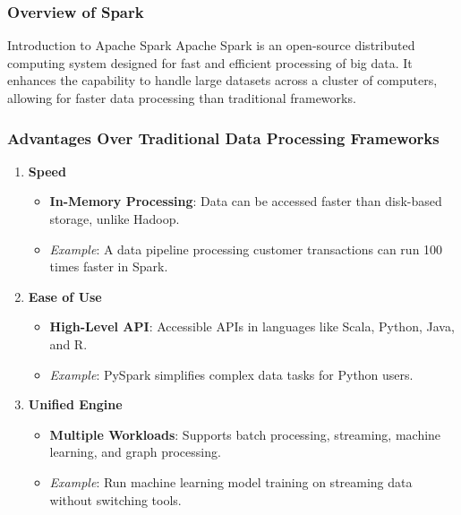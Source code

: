 \documentclass[aspectratio=169]{beamer}
\begin{document}
\begin{frame}[fragile]
    \frametitle{Overview of Spark}
    \begin{block}{Introduction to Apache Spark}
        Apache Spark is an open-source distributed computing system designed for fast and efficient processing of big data. It enhances the capability to handle large datasets across a cluster of computers, allowing for faster data processing than traditional frameworks.
    \end{block}
\end{frame}

\begin{frame}[fragile]
    \frametitle{Advantages Over Traditional Data Processing Frameworks}
    \begin{enumerate}
        \item \textbf{Speed}
            \begin{itemize}
                \item \textbf{In-Memory Processing}: Data can be accessed faster than disk-based storage, unlike Hadoop.
                \item \textit{Example}: A data pipeline processing customer transactions can run 100 times faster in Spark.
            \end{itemize}
        
        \item \textbf{Ease of Use}
            \begin{itemize}
                \item \textbf{High-Level API}: Accessible APIs in languages like Scala, Python, Java, and R.
                \item \textit{Example}: PySpark simplifies complex data tasks for Python users.
            \end{itemize}
        
        \item \textbf{Unified Engine}
            \begin{itemize}
                \item \textbf{Multiple Workloads}: Supports batch processing, streaming, machine learning, and graph processing.
                \item \textit{Example}: Run machine learning model training on streaming data without switching tools.
            \end{itemize}
    \end{enumerate}
\end{frame}
\end{document}
